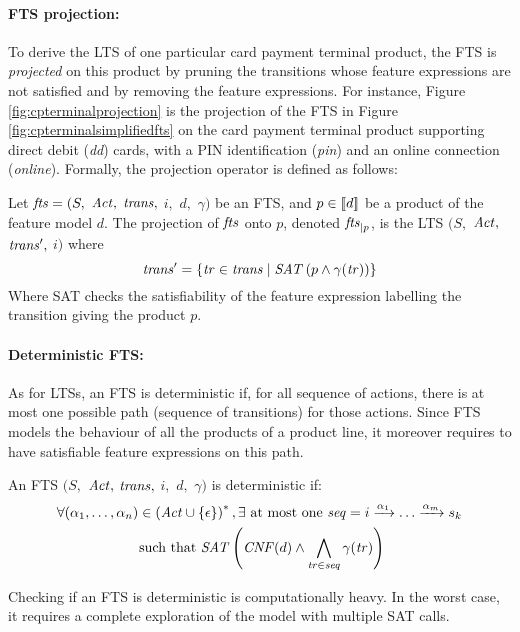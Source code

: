 \paragraph{FTS projection:}

To derive the \gls{LTS} of one particular card payment terminal product, the \gls{FTS} is \emph{projected} \cite{Classen2010,Classen2013b} on this product by pruning the transitions whose feature expressions are not satisfied and by removing the feature expressions. For instance, Figure \ref{fig:cpterminalprojection} is the projection of the \gls{FTS} in Figure \ref{fig:cpterminalsimplifiedfts} on the card payment terminal product supporting direct debit (\textit{dd}) cards, with a \gls{PIN} identification (\textit{pin}) and an online connection (\textit{online}). Formally, the projection operator is defined as follows:
%
\begin{definition}
Let $\mathit{fts} = (S,$ $\mathit{Act},$ $\mathit{trans},$ $i,$ $d,$ $\gamma)$ be an \gls{FTS}, and $p\in [\![ d]\!]$ be a product of the feature model $d$. The projection of $\mathit{fts}$ onto $p$, denoted $\mathit{fts}_{\mid p}$, is the \gls{LTS} $(S,$ $\mathit{Act},$ $\mathit{trans}',$ $i)$ where
$$ \mathit{trans}' = \left\lbrace \mathit{tr} \in \mathit{trans} \mid \mathit{SAT}\left(p \wedge \gamma(\mathit{tr})\right) \right\rbrace $$
Where \gls{SAT} checks the satisfiability of the feature expression labelling the transition giving the product $p$.
\end{definition}


\paragraph{Deterministic FTS:}

As for \glspl{LTS}, an \gls{FTS} is deterministic if, for all sequence of actions, there is at most one possible path (sequence of transitions) for those actions. Since \gls{FTS} models the behaviour of all the products of a product line, it moreover requires to have satisfiable feature expressions on this path.
%
\begin{property}
An \gls{FTS} $(S,$ $\mathit{Act},$ $\mathit{trans},$ $i,$ $d,$ $\gamma)$ is deterministic if:
\begin{multline*}
\forall (\alpha_1, \ldots, \alpha_n) \in \left(\mathit{Act} \cup \left\lbrace \epsilon \right\rbrace\right) ^{*},
\exists \text{ at most one } \mathit{seq} = i \xrightarrow{\alpha_1} \ldots \xrightarrow{\alpha_m} s_k \\
\text{ such that } \mathit{SAT}\left( \mathit{CNF}(d) \wedge \bigwedge_{\mathit{tr} \in \mathit{seq}} \gamma(\mathit{tr}) \right)
\end{multline*}
\end{property}
%
Checking if an \gls{FTS} is deterministic is computationally heavy. In the worst case, it requires a complete exploration of the model with multiple \gls{SAT} calls.


